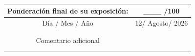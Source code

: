\documentclass[12pt]{article}
\newcommand{\DiaEvaluacionPesentacion}{12}
\newcommand{\MesEvaluacionPesentacion}{Agosto}
\newcommand{\AnhoEvaluacionPesentacion}{2026}
\begin{document}
\begin{longtable}{|p{3.75cm}|p{3.75cm}|p{3.75cm}|p{3.75cm}|}
\multicolumn{2}{|c|}{\textbf{Ponderación final de su exposición:}} & \multicolumn{2}{c|}{\_\_\_ /100} \\ \hline
\multicolumn{2}{|c|}{Día / Mes / Año} &  \multicolumn{2}{c|}{\DiaEvaluacionPesentacion / \MesEvaluacionPesentacion / \AnhoEvaluacionPesentacion} \\  \hline
\multicolumn{2}{|c}{ }& \multicolumn{2}{|c|}{ }  \\
\multicolumn{2}{|c}{ }& \multicolumn{2}{|c|}{ }  \\    
\multicolumn{2}{|c}{Comentario adicional} & \multicolumn{2}{|c|}{ } \\  
\multicolumn{2}{|c}{ }& \multicolumn{2}{|c|}{ }  \\  
\multicolumn{2}{|c}{ }& \multicolumn{2}{|c|}{ }  \\  \hline



\end{longtable}
\end{document}
